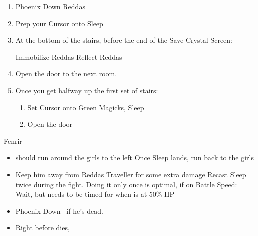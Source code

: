 \begin{enumerate}[resume]
	\item Phoenix Down Reddas
	\item Prep your Cursor onto Sleep
	\item At the bottom of the stairs, before the end of the Save Crystal Screen:
	      \begin{enumerate}
		      \penelof Immobilize Reddas
		      \ashef Reflect Reddas
	      \end{enumerate}
	\item Open the door to the next room.
	\item Once you get halfway up the first set of stairs:
	      \begin{enumerate}
		      \decoy{\ashe}{\balthier}
		      \gambiton{\ashe}
		      \penelof Reflect \balthier
		      \gambiton{\penelo}
		      \item Set Cursor onto Green Magicks, Sleep
		      \item Open the door
	      \end{enumerate}
\end{enumerate}
\begin{battle}{Fenrir}
	\begin{itemize}
		\balthierf Run backwards diagonal, spam Sleep while running.
		\item {} should run around the girls to the left
		      \balthierf Once Sleep lands, run back to the girls
		\item Keep him away from Reddas
		      \balthierf Traveller for some extra damage
		      \balthierf Recast Sleep twice during the fight. Doing it only once is optimal, if on Battle Speed: Wait, but needs to be timed for when  is at 50\% HP
		\item Phoenix Down \vaan\ if he's dead.
		\item Right before  dies, \GirlsGambitOff
	\end{itemize}
\end{battle}